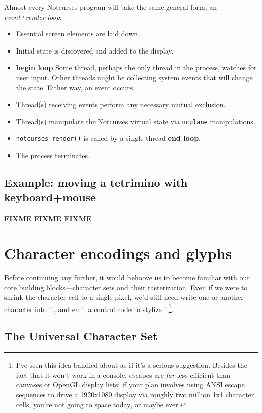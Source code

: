 \documentclass[letterpaper,10pt]{article}
\newenvironment{denseitemize}{
  \begin{itemize}
      \setlength{\itemsep}{0pt}
}{
  \end{itemize}
}
\begin{document}
Almost every Notcurses program will take the same general form, an \textit{event+render loop}:

\begin{denseitemize}
\item{Essential screen elements are laid down.}
\item{Initial state is discovered and added to the display.}
\item{\textbf{begin loop} Some thread, perhaps the only thread in the process, watches
    for user input. Other threads might be collecting system events that will
    change the state. Either way, an event occurs.}
\item{Thread(s) receiving events perform any necessary mutual exclusion.}
\item{Thread(s) manipulate the Notcurses virtual state via \texttt{ncplane} manipulations.}
\item{\texttt{notcurses\_render()} is called by a single thread \textbf{end loop}.}
\item{The process terminates.}
\end{denseitemize}

\subsection{Example: moving a tetrimino with keyboard+mouse}
\textbf{FIXME FIXME FIXME}

\newpage


\section{Character encodings and glyphs}
\label{section:unicode}
Before continuing any further, it would behoove us to become familiar with our
core building blocks---character sets and their rasterization. Even if we were
to shrink the character cell to a single pixel, we'd still need write one or
another character into it, and emit a control code to stylize it\footnote{I've
seen this idea bandied about as if it's a serious suggestion. Besides the fact
that it won't work in a console, escapes are \textit{far} less efficient than
canvases or OpenGL display lists; if your plan involves using ANSI escape
sequences to drive a 1920x1080 display via roughly two million 1x1 character
cells, you're not going to space today, or maybe ever\cite{upgoerfive}.}.
\subsection{The Universal Character Set}
\end{document}
